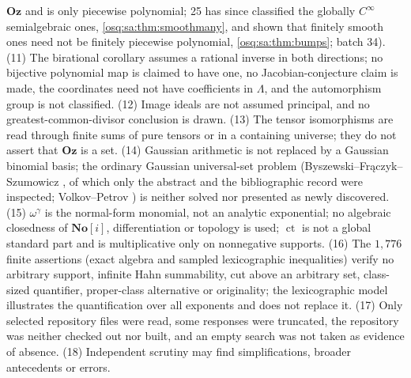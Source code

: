 \documentclass[11pt,letterpaper]{article}
\numberwithin{equation}{section}
\theoremstyle{definition}
\theoremstyle{remark}
\theoremstyle{plain}
\newcommand{\No}{\mathbf{No}}
\newcommand{\Oz}{\mathbf{Oz}}
\newcommand{\SC}{\No[i]}
\newcommand{\ct}{\operatorname{ct}}
\begin{document}
$\Oz$ and is only piecewise polynomial; 25 has since classified the globally $C^\infty$ semialgebraic ones, \cref{osq:sa:thm:smoothmany}, and shown
that finitely smooth ones need not be finitely piecewise polynomial, \cref{osq:sa:thm:bumps}; batch 34). (11) The birational corollary assumes a rational inverse in both directions; no bijective polynomial map is
claimed to have one, no Jacobian-conjecture claim is made, the coordinates need not have coefficients in $\Lambda$, and the automorphism group is not
classified. (12) Image ideals are not assumed principal, and no greatest-common-divisor conclusion is drawn. (13) The tensor isomorphisms are read
through finite sums of pure tensors or in a containing universe; they do not assert that $\Oz$ is a set. (14) Gaussian arithmetic is not replaced
by a Gaussian binomial basis; the ordinary Gaussian universal-set problem (Byszewski--Fr\k aczyk--Szumowicz \cite{BFS}, of which only the abstract and the
bibliographic record were inspected; Volkov--Petrov \cite{VP}) is neither solved nor presented as newly discovered. (15) $\omega^\gamma$ is the normal-form
monomial, not an analytic exponential; no algebraic closedness of $\SC$, differentiation or topology is used; $\ct$ is not a global standard part and
is multiplicative only on nonnegative supports. (16) The $1{,}776$ finite assertions (exact algebra and sampled lexicographic inequalities) verify no
arbitrary support, infinite Hahn summability, cut above an arbitrary set, class-sized quantifier, proper-class alternative or originality; the
lexicographic model illustrates the quantification over all exponents and does not replace it. (17) Only selected repository files were read, some
responses were truncated, the repository was neither checked out nor built, and an empty search was not taken as evidence of absence.
(18) Independent scrutiny may find simplifications, broader antecedents or errors.
\end{document}
